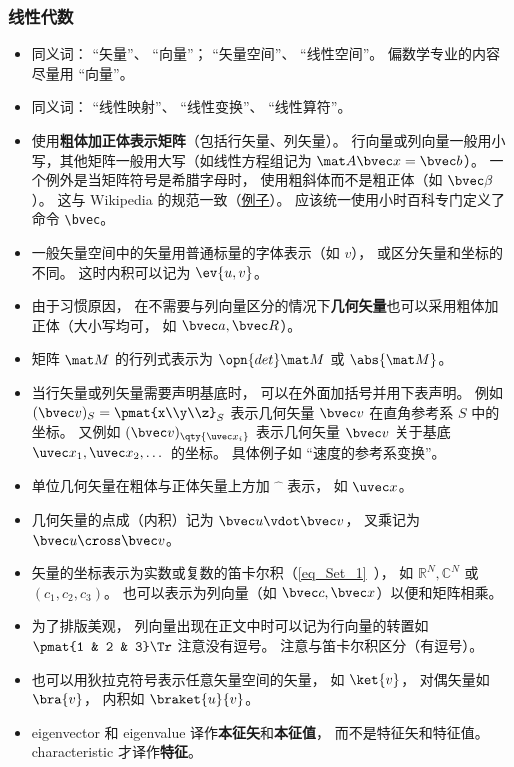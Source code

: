 \subsubsection{线性代数}
\begin{itemize}
\item 同义词： “矢量”、 “向量”； “矢量空间”、 “线性空间”。 偏数学专业的内容尽量用 “向量”。
\item 同义词： “线性映射”、 “线性变换”、 “线性算符”。
\item 使用\textbf{粗体加正体表示矩阵}（包括行矢量、列矢量）。 行向量或列向量一般用小写，其他矩阵一般用大写（如线性方程组记为 $\mat A \bvec x = \bvec b$）。 一个例外是当矩阵符号是希腊字母时， 使用粗斜体而不是粗正体（如 $\bvec \beta$）。 这与 Wikipedia 的规范一致（\href{https://en.wikipedia.org/wiki/Angular_acceleration}{例子}）。 应该统一使用小时百科专门定义了命令 \verb|\bvec|。
\item 一般矢量空间中的矢量用普通标量的字体表示（如 $v$）， 或区分矢量和坐标的不同。 这时内积可以记为 $\ev{u, v}$。
\item 由于习惯原因， 在不需要与列向量区分的情况下\textbf{几何矢量}也可以采用粗体加正体（大小写均可， 如 $\bvec a, \bvec R$）。
\item 矩阵 $\mat M$ 的行列式表示为 $\opn{det}\mat M$ 或 $\abs{\mat M}$。
\item 当行矢量或列矢量需要声明基底时， 可以在外面加括号并用下表声明。 例如 $(\bvec v)_S = \pmat{x\\y\\z}_S$ 表示几何矢量 $\bvec v$ 在直角参考系 $S$ 中的坐标。 又例如 $(\bvec v)_{\qty{\uvec x_i}}$ 表示几何矢量 $\bvec v$ 关于基底 $\uvec x_1, \uvec x_2, \dots$ 的坐标。 具体例子如 “速度的参考系变换”。
\item 单位几何矢量在粗体与正体矢量上方加 $\hat{\phantom{x}}$ 表示， 如 $\uvec x$。
\item 几何矢量的点成（内积）记为 $\bvec u \vdot \bvec v$， 叉乘记为 $\bvec u \cross \bvec v$。
\item 矢量的坐标表示为实数或复数的笛卡尔积（\autoref{eq_Set_1}~）， 如 $\mathbb R^N, \mathbb C^N$ 或 $(c_1, c_2, c_3)$。 也可以表示为列向量（如 $\bvec c, \bvec x$）以便和矩阵相乘。
\item 为了排版美观， 列向量出现在正文中时可以记为行向量的转置如 $\pmat{1 & 2 & 3}\Tr$ 注意没有逗号。 注意与笛卡尔积区分（有逗号）。
\item 也可以用狄拉克符号表示任意矢量空间的矢量， 如 $\ket{v}$， 对偶矢量如 $\bra{v}$， 内积如 $\braket{u}{v}$。
\item eigenvector 和 eigenvalue 译作\textbf{本征矢}和\textbf{本征值}， 而不是特征矢和特征值。 characteristic 才译作\textbf{特征}。
\end{itemize}

